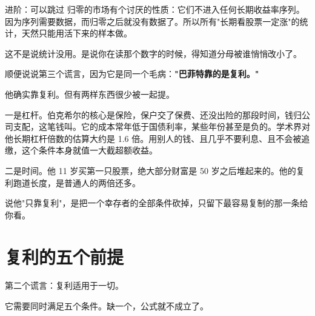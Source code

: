 \begin{deepbox}{进阶：可以跳过}
归零的市场有个讨厌的性质：它们不进入任何长期收益率序列。因为序列需要数据，而归零之后就没有数据了。所以所有"长期看股票一定涨"的统计，天然只能用活下来的样本做。

这不是说统计没用。是说你在读那个数字的时候，得知道分母被谁悄悄改小了。

\end{deepbox}

顺便说说第三个谎言，因为它是同一个毛病：\textbf{"巴菲特靠的是复利。"}

他确实靠复利。但有两样东西很少被一起提。

一是杠杆。伯克希尔的核心是保险，保户交了保费、还没出险的那段时间，钱归公司支配，这笔钱叫。它的成本常年低于国债利率，某些年份甚至是负的。学术界对他长期杠杆倍数的估算大约是 1.6 倍。用别人的钱、且几乎不要利息、且不会被追缴，这个条件本身就值一大截超额收益。

二是时间。他 11 岁买第一只股票，绝大部分财富是 50 岁之后堆起来的。他的复利跑道长度，是普通人的两倍还多。

说他"只靠复利"，是把一个幸存者的全部条件砍掉，只留下最容易复制的那一条给你看。

\section{复利的五个前提}

第二个谎言：复利适用于一切。

它需要同时满足五个条件。缺一个，公式就不成立了。

\begin{flowlist}
\end{flowlist}

